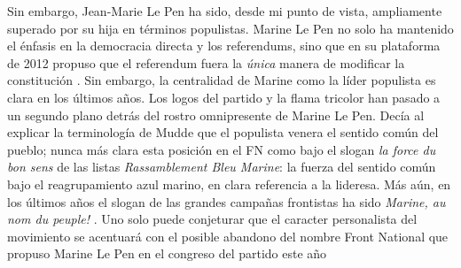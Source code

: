 Sin embargo, Jean-Marie Le Pen ha sido, desde mi punto de vista, ampliamente superado por su hija en términos populistas. Marine Le Pen no solo ha mantenido el énfasis en la democracia directa y los referendums, sino que en su plataforma de 2012 propuso que el referendum fuera la \textit{única} manera de modificar la constitución \parencite[8, énfasis mío]{LePen12}. Sin embargo, la centralidad de Marine como la líder populista es clara en los últimos años. Los logos del partido y la flama tricolor han pasado a un segundo plano detrás del rostro omnipresente de Marine Le Pen. Decía al explicar la terminología de Mudde que el populista venera el sentido común del pueblo; nunca más clara esta posición en el FN como bajo el slogan \textit{la force du bon sens} de las listas \textit{Rassamblement Bleu Marine}: la fuerza del sentido común bajo el reagrupamiento azul marino, en clara referencia a la lideresa. Más aún, en los últimos años el slogan de las grandes campañas frontistas ha sido \textit{Marine, au nom du peuple!} \parencite{Gross16}. Uno solo puede conjeturar que el caracter personalista del movimiento se acentuará con el posible abandono del nombre Front National que propuso Marine Le Pen en el congreso del partido este año